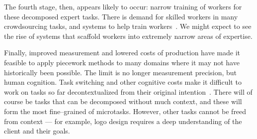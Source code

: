 \documentclass[trackingWork]{subfiles}
\begin{document}
The fourth stage, then, appears likely to occur: narrow training of workers for these decomposed expert tasks. 
There is demand for skilled workers in many crowdsourcing tasks, and systems to help train workers~\cite{suzukiAtelier}. 
We might expect to see the rise of systems that scaffold workers into extremely narrow areas of expertise.

Finally, improved measurement and lowered costs of production have made it feasible to apply piecework methods to many domains where it may not have historically been possible.
The limit is no longer measurement precision, but human cognition. 
Task switching and other cognitive costs make it difficult
to work on tasks so far decontextualized from their original intention~\cite{delayAndOrderLasecki}.
There will of course be tasks that can be decomposed without much context,
and these will form the most fine--grained of microtasks.
However, other tasks cannot be freed from context
--- for example,
logo design requires a deep understanding of the client and their goals.
\end{document}
